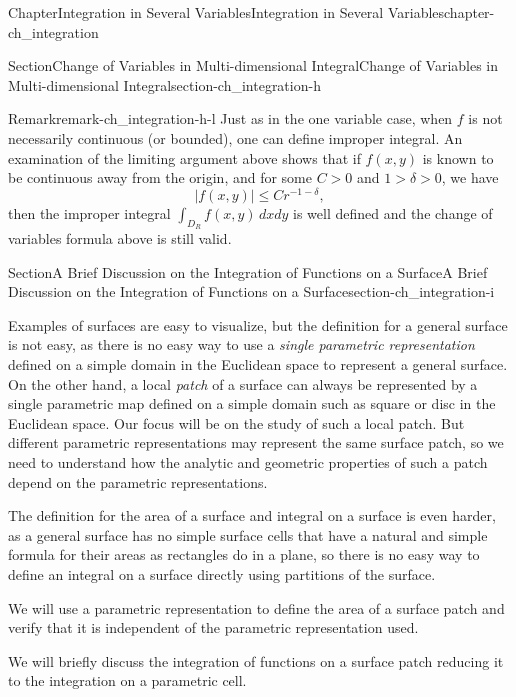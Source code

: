 \documentclass[oneside,10pt,]{book}
\numberwithin{equation}{section}
\begin{document}
\begin{chapterptx}{Chapter}{Integration in Several Variables}{}{Integration in Several Variables}{}{}{chapter-ch_integration}
\begin{sectionptx}{Section}{Change of Variables in Multi-dimensional Integral}{}{Change of Variables in Multi-dimensional Integral}{}{}{section-ch_integration-h}
\begin{remark}{Remark}{}{remark-ch_integration-h-l}
Just as in the one variable case, when \(f\) is not necessarily continuous (or bounded), one can define improper integral. An examination of the limiting argument above shows that if \(f(x,y)\) is known to be continuous away from the origin, and for some \(C>0\) and \(1>\delta >0\), we have%
\begin{equation*}
|f(x,y)| \le C r^{-1-\delta},
\end{equation*}
then the improper integral \(\int_{D_R}  f(x,y)\, dxdy\) is well defined and the change of variables formula above is still valid.%
\end{remark}
\end{sectionptx}
%
%
\typeout{************************************************}
\typeout{************************************************}
%
\begin{sectionptx}{Section}{A Brief Discussion on the Integration of Functions on a Surface}{}{A Brief Discussion on the Integration of Functions on a Surface}{}{}{section-ch_integration-i}
\begin{introduction}{}%
Examples of surfaces are easy to visualize, but the definition for a general surface is not easy, as there is no easy way to use a \emph{single parametric representation} defined on a simple domain in the Euclidean space to represent a general surface.  On the other hand, a local \emph{patch} of a surface can always be represented by a single parametric map defined on a simple domain such as square or disc in the Euclidean space. Our focus will be on the study of such a local patch. But different parametric representations may represent the same surface patch, so we need to understand how the analytic and geometric properties of such a patch depend on the parametric representations.%
\par
The definition for the area of a surface and integral on a surface is even harder, as a general surface has no simple surface cells that have a natural and simple formula for their areas as rectangles do in a plane, so there is no easy way to define an integral on a surface directly using partitions of the surface.%
\par
We will use a parametric representation to define the area of a surface patch and verify that it is independent of the parametric representation used.%
\par
We will  briefly discuss the integration of functions on a surface patch reducing it to the integration on a parametric cell.%

\end{introduction}
\end{sectionptx}
\end{chapterptx}
\end{document}
